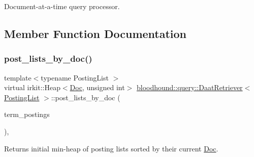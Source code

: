 Document-\/at-\/a-\/time query processor. 

\subsection{Member Function Documentation}
\mbox{\label{classbloodhound_1_1query_1_1DaatRetriever_abf9a1012732fe0879d1bf080faf293b6}} 
\subsubsection{\texorpdfstring{post\+\_\+lists\+\_\+by\+\_\+doc()}{post\_lists\_by\_doc()}}
{\footnotesize\ttfamily template$<$typename Posting\+List $>$ \\
virtual irkit\+::\+Heap$<$\hyperlink{structbloodhound_1_1Doc}{Doc}, unsigned int$>$ \hyperlink{classbloodhound_1_1query_1_1DaatRetriever}{bloodhound\+::query\+::\+Daat\+Retriever}$<$ \hyperlink{classbloodhound_1_1PostingList}{Posting\+List} $>$\+::post\+\_\+lists\+\_\+by\+\_\+doc (\begin{DoxyParamCaption}\item[{const std\+::vector$<$ \hyperlink{classbloodhound_1_1PostingList}{Posting\+List} $>$ \&}]{term\+\_\+postings }\end{DoxyParamCaption})\hspace{0.3cm}{\ttfamily [inline]}, {\ttfamily [virtual]}}



Returns initial min-\/heap of posting lists sorted by their current \hyperlink{structbloodhound_1_1Doc}{Doc}. 

\mbox{\label{classbloodhound_1_1query_1_1DaatRetriever_ab80b4867fc263827dc2fdbe0965a2e8c}} 
